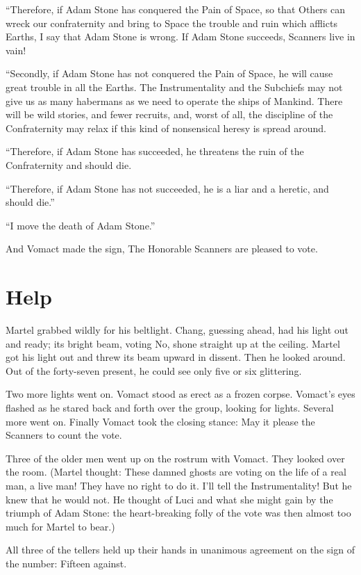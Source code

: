 ``Therefore, if Adam Stone has conquered the Pain of Space, so that Others can wreck our confraternity and bring to Space the trouble and ruin which afflicts Earths, I say that Adam Stone is wrong. If Adam Stone succeeds, Scanners live in vain!

``Secondly, if Adam Stone has not conquered the Pain of Space, he will cause great trouble in all the Earths. The Instrumentality and the Subchiefs may not give us as many habermans as we need to operate the ships of Mankind. There will be wild stories, and fewer recruits, and, worst of all, the discipline of the Confraternity may relax if this kind of nonsensical heresy is spread around.

``Therefore, if Adam Stone has succeeded, he threatens the ruin of the Confraternity and should die.

``Therefore, if Adam Stone has not succeeded, he is a liar and a heretic, and should die.''

``I move the death of Adam Stone.''

And Vomact made the sign, The Honorable Scanners are pleased to vote.

 
\section{Help}

Martel grabbed wildly for his beltlight. Chang, guessing ahead, had his light out and ready; its bright beam, voting No, shone straight up at the ceiling. Martel got his light out and threw its beam upward in dissent. Then he looked around. Out of the forty-seven present, he could see only five or six glittering.

Two more lights went on. Vomact stood as erect as a frozen corpse. Vomact's eyes flashed as he stared back and forth over the group, looking for lights. Several more went on. Finally Vomact took the closing stance: May it please the Scanners to count the vote.

Three of the older men went up on the rostrum with Vomact. They looked over the room. (Martel thought: These damned ghosts are voting on the life of a real man, a live man! They have no right to do it. I'll tell the Instrumentality! But he knew that he would not. He thought of Luci and what she might gain by the triumph of Adam Stone: the heart-breaking folly of the vote was then almost too much for Martel to bear.)

All three of the tellers held up their hands in unanimous agreement on the sign of the number: Fifteen against.

